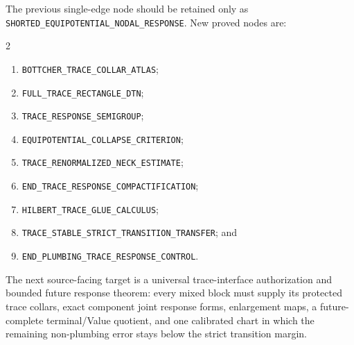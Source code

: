 \documentclass[10pt]{article}
\theoremstyle{definition}
\theoremstyle{remark}
\begin{document}
The previous single-edge node should be retained only as
\texttt{SHORTED\_EQUIPOTENTIAL\_NODAL\_RESPONSE}. New proved nodes are:
\begin{multicols}{2}
\small
\begin{enumerate}
 \item \texttt{BOTTCHER\_TRACE\_COLLAR\_ATLAS};
 \item \texttt{FULL\_TRACE\_RECTANGLE\_DTN};
 \item \texttt{TRACE\_RESPONSE\_SEMIGROUP};
 \item \texttt{EQUIPOTENTIAL\_COLLAPSE\_CRITERION};
 \item \texttt{TRACE\_RENORMALIZED\_NECK\_ESTIMATE};
 \item \texttt{END\_TRACE\_RESPONSE\_COMPACTIFICATION};
 \item \texttt{HILBERT\_TRACE\_GLUE\_CALCULUS};
 \item \texttt{TRACE\_STABLE\_STRICT\_TRANSITION\_TRANSFER}; and
 \item \texttt{END\_PLUMBING\_TRACE\_RESPONSE\_CONTROL}.
\end{enumerate}
\end{multicols}

The next source-facing target is a universal trace-interface authorization and
bounded future response theorem: every mixed block must supply its protected
trace collars, exact component joint response forms, enlargement maps, a
future-complete terminal/Value quotient, and one calibrated chart in which the
remaining non-plumbing error stays below the strict transition margin.
\end{document}
